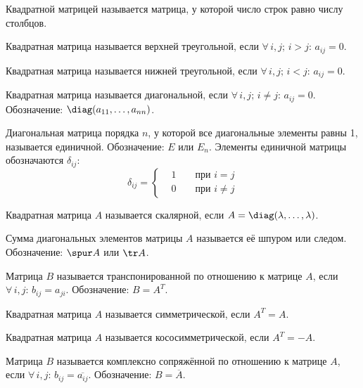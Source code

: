 \documentclass[12pt]{article}
\begin{document}
\begin{definition}
    Квадратной матрицей называется матрица, у которой число строк равно числу столбцов.
\end{definition}
\begin{definition}
    Квадратная матрица называется верхней треугольной, если $\forall\,i,j;\,i>j:\,a_{ij}=0$.
\end{definition}
\begin{definition}
    Квадратная матрица называется нижней треугольной, если $\forall\,i,j;\,i<j:\,a_{ij}=0$.
\end{definition}
\begin{definition}
    Квадратная матрица называется диагональной, если $\forall\,i,j;\,i\neq j:\,a_{ij}=0$. Обозначение: $\diag(a_{11},\ldots,a_{nn})$.
\end{definition}
\begin{definition}
    Диагональная матрица порядка $n$, у которой все диагональные элементы равны 1, называется единичной. Обозначение: $E$ или $E_n$. Элементы единичной матрицы обозначаются $\delta_{ij}$:
    $$\delta_{ij}=\left\{\begin{alignedat}{2}
        & 1 && \text{ при }i=j \\
        & 0  && \text{ при }i\neq j
      \end{alignedat}\right.$$
\end{definition}
\begin{definition}
    Квадратная матрица $A$ называется скалярной, если $A=\diag(\lambda,\ldots,\lambda)$.
\end{definition}
\begin{definition}
    Сумма диагональных элементов матрицы $A$ называется её шпуром или следом. Обозначение: $\spur A$ или $\tr A$.
\end{definition}
\begin{definition}
    Матрица $B$ называется транспонированной по отношению к матрице $A$, если $\forall\,i,j:\,b_{ij}=a_{ji}$. Обозначение: $B=A^T$.
\end{definition}
\begin{definition}
    Квадратная матрица $A$ называется симметрической, если $A^T=A$.
\end{definition}
\begin{definition}
    Квадратная матрица $A$ называется кососимметрической, если $A^T=-A$.
\end{definition}
\begin{definition}
    Матрица $B$ называется комплексно сопряжённой по отношению к матрице $A$, если $\forall\,i,j:\,b_{ij}=\overline{a_{ij}}$. Обозначение: $B=\overline{A}$.
\end{definition}
\end{document}

